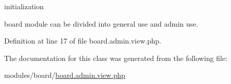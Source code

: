 initialization 

board module can be divided into general use and admin use.~\newline


Definition at line 17 of file board.\+admin.\+view.\+php.



The documentation for this class was generated from the following file\+:\begin{DoxyCompactItemize}
\item 
modules/board/\hyperlink{board_8admin_8view_8php}{board.\+admin.\+view.\+php}\end{DoxyCompactItemize}

